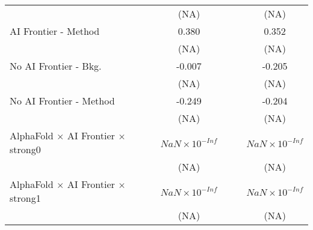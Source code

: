 \begin{tabular}{lcccccc}
                                                                              &                        &                        & (NA)                   &                        &                        & (NA)\\   
   AI Frontier - Method                                                       &                        &                        & 0.380                  &                        &                        & 0.352\\   
                                                                              &                        &                        & (NA)                   &                        &                        & (NA)\\   
   No AI Frontier - Bkg.                                                      &                        &                        & -0.007                 &                        &                        & -0.205\\   
                                                                              &                        &                        & (NA)                   &                        &                        & (NA)\\   
   No AI Frontier - Method                                                    &                        &                        & -0.249                 &                        &                        & -0.204\\   
                                                                              &                        &                        & (NA)                   &                        &                        & (NA)\\   
   AlphaFold $\times$ AI Frontier $\times$ strong0                            &                        &                        & $NaN\times 10^{-Inf}$  &                        &                        & $NaN\times 10^{-Inf}$\\    
                                                                              &                        &                        & (NA)                   &                        &                        & (NA)\\   
   AlphaFold $\times$ AI Frontier $\times$ strong1                            &                        &                        & $NaN\times 10^{-Inf}$  &                        &                        & $NaN\times 10^{-Inf}$\\    
                                                                              &                        &                        & (NA)                   &                        &                        & (NA)\\   

\end{tabular}
